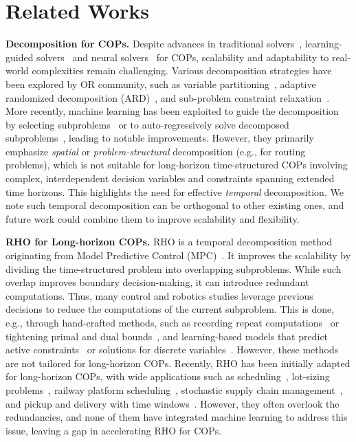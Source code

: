 \section{Related Works}
\label{sec:related_work}

\textbf{Decomposition for COPs.} Despite advances in traditional solvers~\citep{pisinger2019large,vidal2022hybrid,xiong2022survey}, learning-guided solvers~\citep{labassi2022learning, scavuzzo2022learning, wang2023linsatnet,li2024learning} and neural solvers~\citep{kool2018attention,ma2024learning,zhang2024let,ye2024deepaco} for COPs, scalability and adaptability to real-world complexities remain challenging. Various decomposition strategies have been explored by OR community, such as variable partitioning~\citep{helsgaun2017extension}, adaptive randomized decomposition (ARD)~\citep{pacino2011large}, and sub-problem constraint relaxation~\citep{pisinger2007using}. More recently, machine learning has been exploited to guide the decomposition by selecting subproblems~\citep{li2021learning, zong2022rbg, huang2022anytime} or to auto-regressively solve decomposed subproblems~\citep{wang2021multiobjective,ye2024glop,luo2024self}, leading to notable improvements. However, they primarily emphasize \emph{spatial} or \emph{problem-structural} decomposition (e.g., for routing problems), which is not suitable for long-horizon time-structured COPs involving complex, interdependent decision variables and constraints spanning extended time horizons. This highlights the need for effective \emph{temporal} decomposition. We note such temporal decomposition can be orthogonal to other existing ones, and future work could combine them to improve scalability and flexibility.

\textbf{RHO for Long-horizon COPs.}
RHO is a temporal decomposition method originating from Model Predictive Control (MPC)~\citep{garcia1989model}. It improves the scalability by dividing the time-structured problem into overlapping subproblems. While such overlap improves boundary decision-making, it can introduce redundant computations. Thus, many control and robotics studies leverage previous decisions to reduce the computations of the current subproblem. This is done, e.g., through hand-crafted methods, such as recording repeat computations~\citep{hespanhol2019structure} or tightening primal and dual bounds~\citep{marcucci2020warm}, and learning-based models that predict active constraints~\citep{bertsimas2022online} or solutions for discrete variables~\citep{cauligi2021coco}. However, these methods are not tailored for long-horizon COPs.
Recently, RHO has been initially adapted for long-horizon COPs, with wide applications such as scheduling~\citep{bischi2019rolling}, lot-sizing problems~\citep{glomb2022rolling}, railway platform scheduling~\citep{lu2022train}, stochastic supply chain management~\citep{fattahi2022data}, and pickup and delivery with time windows~\citep{kim2023rolling}. However, they often overlook the redundancies, and none of them have integrated machine learning to address this issue, leaving a gap in accelerating RHO for COPs.



